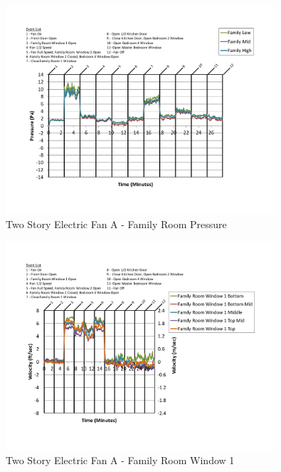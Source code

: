 \documentclass{article}
\begin{document}
\begin{appendices}
	\begin{figure}[H]
		\centering
		\includegraphics[height=3.05in,trim=0.67in 1.1in 0.67in 0.8in,clip=true]{0_Images/Results_Charts/ColdFlow/Two_Story/Electric/A/Family_Room_Pressure.pdf}
		\caption{Two Story Electric Fan A - Family Room Pressure}
	\end{figure}
 

	\begin{figure}[H]
		\centering
		\includegraphics[height=3.05in,trim=0.67in 1.1in 0.67in 0.8in,clip=true]{0_Images/Results_Charts/ColdFlow/Two_Story/Electric/A/Family_Room_Window_1.pdf}
		\caption{Two Story Electric Fan A - Family Room Window 1}
	\end{figure}
 
	\clearpage


\end{appendices}
\end{document}

